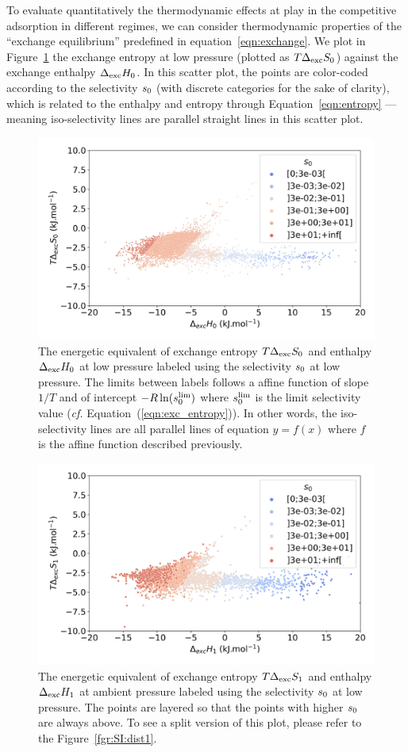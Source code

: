 \documentclass[main.tex]{subfiles}
\begin{document}
  
To evaluate quantitatively the thermodynamic effects at play in the competitive adsorption in different regimes, we can consider thermodynamic properties of the ``exchange equilibrium'' predefined in equation~\ref{eqn:exchange}. We plot in Figure~\ref{fgr:HSplot_0} the exchange entropy at low pressure (plotted as $T\Delta_{\text{exc}}S_{\text{0}}$) against the exchange enthalpy $\Delta_{\text{exc}}H_{\text{0}}$. In this scatter plot, the points are color-coded according to the selectivity $s_{\text{0}}$ (with discrete categories for the sake of clarity), which is related to the enthalpy and entropy through Equation~\ref{eqn:entropy} --- meaning iso-selectivity lines are parallel straight lines in this scatter plot.
  
  \begin{figure}[t]
  \centering
    \includegraphics[width=0.7\linewidth]{figures/2-thermo/enthalpy_entropy_0_s_0.jpg}
    \caption{The energetic equivalent of exchange entropy $T\Delta_{\text{exc}}S_{\text{0}}$ and enthalpy $\Delta_{\text{exc}}H_{\text{0}}$ at low pressure labeled using the selectivity $s_{\text{0}}$ at low pressure. The limits between labels follows a affine function of slope $1/T$ and of intercept $-R\ln(s_{\text{0}}^{\text{lim}})$ where $s_{\text{0}}^{\text{lim}}$ is the limit selectivity value (\emph{cf.} Equation~(\ref{eqn:exc_entropy})). In other words, the iso-selectivity lines are all parallel lines of equation $y=f(x)$ where $f$ is the affine function described previously.}
    \label{fgr:HSplot_0}
  \end{figure}
  
  
  \begin{figure}[t]
  \centering
    \includegraphics[width=0.7\linewidth]{figures/2-thermo/enthalpy_entropy_2080_s_0.jpg}
    \caption{The energetic equivalent of exchange entropy $T\Delta_{\text{exc}}S_{\text{1}}$ and enthalpy $\Delta_{\text{exc}}H_{\text{1}}$ at ambient pressure labeled using the selectivity $s_{\text{0}}$ at low pressure. The points are layered so that the points with higher $s_{\text{0}}$ are always above. To see a split version of this plot, please refer to the Figure~\ref{fgr:SI:dist1}.}
    \label{fgr:HSplot_1}
  \end{figure}
\end{document}
